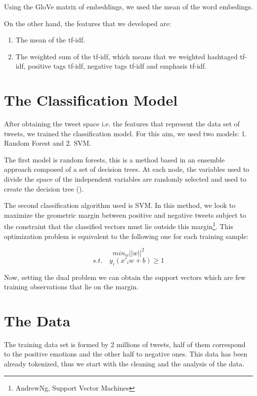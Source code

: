 \documentclass[10pt,conference,compsocconf]{IEEEtran}
\begin{document}
Using the GloVe matrix of embeddings, we used the mean of the word embedings. 

On the other hand, the features that we developed are: 

\begin{enumerate}
	\item The mean of the tf-idf. 
	\item The weighted sum of the tf-idf, which means that we weighted hashtaged  tf-idf, positive tags  tf-idf, negative tags  tf-idf and emphasis  tf-idf.  		
	\end{enumerate}

\section{The Classification Model}
After obtaining the tweet space i.e. the features that represent the data set of tweets, we trained the classification model. For this aim, we used two models: 1. Random Forest and 2. SVM. 

The first model is random forests, this is a method based in an ensemble approach composed of a set of decision trees. At each node, the variables used to divide the space of the independent variables are randomly selected and used to create the decision tree (\cite{breiman2001random}). 

The second classification algorithm used is SVM. In this method, we look to maximize the geometric margin between positive and negative tweets subject to the constraint that the classified vectors must lie outside this margin\footnote{AndrewNg, Support Vector Machines}. This optimization problem is equivalent to the following one for each training sample:

$$min_w || w ||^2$$
$$s.t. \quad y_i(x'_iw +b)\geq 1$$

 Now, setting the dual problem we can obtain the support vectors which are few training observations that lie on the margin. 
 



\section{The Data}
\label{S3}

The training data set is formed by 2 millions of tweets, half of them correspond to the positive emotions and the other half to negative ones. This data has been already tokenized, thus we start with the cleaning and the analysis of the data.  
\end{document}
